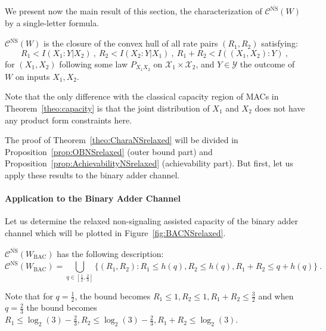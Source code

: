   We present now the main result of this section, the characterization of $\mathcal{C}^{\overline{\mathrm{NS}}}(W)$ by a single-letter formula.
  
  \begin{theorem}
        \label{theo:CharaNSrelaxed}
        $\mathcal{C}^{\overline{\mathrm{NS}}}(W)$ is the closure of the convex hull of all rate pairs $(R_1,R_2)$ satisfying:
        \[ R_1 < I(X_1:Y|X_2)\ ,\ R_2 < I(X_2:Y|X_1)\ ,\ R_1+R_2 < I((X_1,X_2):Y) \ ,\]
        for $(X_1,X_2)$ following some law $P_{X_1X_2}$ on $\mathcal{X}_1 \times \mathcal{X}_2$, and $Y \in \mathcal{Y}$ the outcome of $W$ on inputs $X_1,X_2$.
  \end{theorem}

  \begin{rk}
    Note that the only difference with the classical capacity region of MACs in Theorem~\ref{theo:capacity} is that the joint distribution of $X_1$ and $X_2$ does not have any product form constraints here.
  \end{rk}

  The proof of Theorem~\ref{theo:CharaNSrelaxed} will be divided in Proposition~\ref{prop:OBNSrelaxed} (outer bound part) and Proposition~\ref{prop:AchievabilityNSrelaxed} (achievability part). But first, let us apply these results to the binary adder channel.
  
  \paragraph{Application to the Binary Adder Channel} 
  Let us determine the relaxed non-signaling assisted capacity of the binary adder channel which will be plotted in Figure~\ref{fig:BACNSrelaxed}.
  
  \begin{proposition}
    \label{prop:BACcapacityNSrelaxed}
     $\mathcal{C}^{\overline{\mathrm{NS}}}(W_{\text{BAC}})$ has the following description:
   \[ \mathcal{C}^{\overline{\mathrm{NS}}}(W_{\text{BAC}}) =  \bigcup_{q \in \left[\frac{1}{2},\frac{2}{3}\right]} \{ (R_1,R_2) : R_1 \leq h\left(q\right), R_2 \leq h\left(q\right), R_1+R_2 \leq q+h\left(q\right)\} \ . \]
  \end{proposition}

  \begin{rk}
    Note that for $q=\frac{1}{2}$, the bound becomes $R_1 \leq 1, R_2 \leq 1, R_1+R_2 \leq \frac{3}{2}$ and when $q=\frac{2}{3}$ the bound becomes $R_1 \leq \log_2(3)-\frac{2}{3}, R_2 \leq \log_2(3)-\frac{2}{3}, R_1+R_2 \leq \log_2(3)$.
  \end{rk}
  
